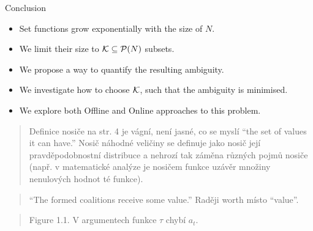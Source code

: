 \documentclass[aspectratio=169]{beamer}
\begin{document}
\begin{frame}{Conclusion}
	\begin{itemize}
		\item Set functions grow exponentially with the size of $ N $.
		\item We limit their size to $ \mathcal{K} \subseteq \mathcal{P}\!\left(N\right) $ subsets.
		\item We propose a way to quantify the resulting ambiguity.
		\item We investigate how to choose $ \mathcal{K} $, such that the ambiguity is minimised.
		\item We explore both Offline and Online approaches to this problem.
	\end{itemize}
\end{frame}

\appendix

\begin{frame}{}
	\begin{quote}
		Definice nosiče na str. 4 je vágní, není jasné, co se myslí “the set of values it can have.” Nosič náhodné veličiny se definuje jako nosič její pravděpodobnostní distribuce a nehrozí tak záměna různých pojmů nosiče (např. v matematické analýze je nosičem funkce uzávěr množiny nenulových hodnot té funkce).
	\end{quote}
	
	 
\end{frame}

\begin{frame}
	\begin{quote}
		“The formed coalitions receive some value.” Raději worth místo “value”.
	\end{quote}
\end{frame}

\begin{frame}
	\begin{quote}
		Figure 1.1. V argumentech funkce $ \tau $ chybí $ a_t $.
	\end{quote}
	\begin{center}
		\vspace{2em}
	\end{center}
\end{frame}
\end{document}
